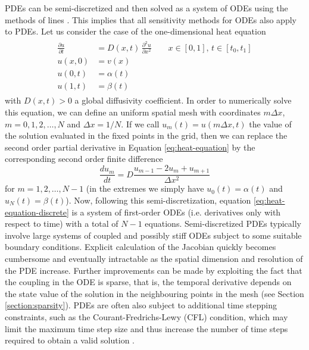 PDEs can be semi-discretized and then solved as a system of ODEs using the methods of lines \cite{ascher2008numerical}. 
This implies that all sensitivity methods for ODEs also apply to PDEs. 
Let us consider the case of the one-dimensional heat equation
\begin{align}
\begin{split}
 \frac{\partial u}{\partial t}
 &= 
 D(x,t) \, 
 \frac{\partial^2 u}{\partial x^2} \qquad x \in [0,1], \, t \in [t_0, t_1]\\
 u(x, 0) &= v(x) \\
 u(0, t) &= \alpha(t) \\
 u(1, t) &= \beta(t)
 \label{eq:heat-equation}
\end{split}
\end{align}
with $D(x, t) > 0$ a global diffusivity coefficient.
In order to numerically solve this equation, we can define an uniform spatial mesh with coordinates $m \Delta x$, $m=0, 1, 2, \ldots, N$ and $\Delta x = 1 / N$.
If we call $u_m(t) = u(m \Delta x, t)$ the value of the solution evaluated in the fixed points in the grid, then we can replace the second order partial derivative in Equation \eqref{eq:heat-equation} by the corresponding second order finite difference
\begin{equation}
 \frac{d u_m}{dt} 
 = 
 D 
 \frac{u_{m-1} - 2u_m + u_{m+1}}{\Delta x^2}
 \label{eq:heat-equation-discrete}
\end{equation}
for $m = 1, 2, \ldots, N-1$ (in the extremes we simply have $u_0(t) = \alpha(t)$ and $u_N(t)=\beta(t)$).
Now, following this semi-discretization, equation \eqref{eq:heat-equation-discrete} is a system of first-order ODEs  (i.e. derivatives only with respect to time) with a total of $N-1$ equations.
Semi-discretized PDEs typically involve large systems of coupled and possibly stiff ODEs subject to some suitable boundary conditions. 
Explicit calculation of the Jacobian quickly becomes cumbersome and eventually intractable as the spatial dimension and resolution of the PDE increase.
Further improvements can be made by exploiting the fact that the coupling in the ODE is sparse, that is, the temporal derivative depends on the state value of the solution in the neighbouring points in the mesh (see Section \ref{section:sparsity}).
PDEs are often also subject to additional time stepping constraints, such as the Courant-Fredrichs-Lewy (CFL) condition, which may limit the maximum time step size and thus increase the number of time steps required to obtain a valid solution \cite{courantPartialDifferenceEquations1967}. 


